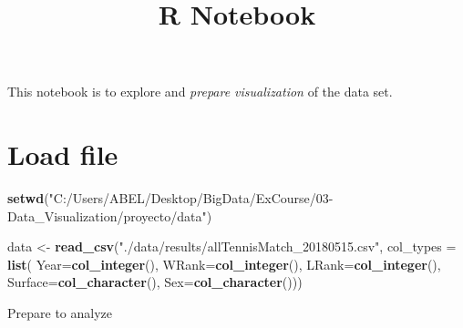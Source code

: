 \documentclass[]{article}
\title{R Notebook}
\author{}
\date{}
\newenvironment{Shaded}{\begin{snugshade}}{\end{snugshade}}
\newcommand{\CommentTok}[1]{\textcolor[rgb]{0.56,0.35,0.01}{\textit{#1}}}
\newcommand{\DataTypeTok}[1]{\textcolor[rgb]{0.13,0.29,0.53}{#1}}
\newcommand{\KeywordTok}[1]{\textcolor[rgb]{0.13,0.29,0.53}{\textbf{#1}}}
\newcommand{\NormalTok}[1]{#1}
\newcommand{\StringTok}[1]{\textcolor[rgb]{0.31,0.60,0.02}{#1}}
\begin{document}
\maketitle

This notebook is to explore and \emph{prepare visualization} of the data
set.

\hypertarget{load-file}{%
\section{Load file}\label{load-file}}

\begin{Shaded}
\begin{Highlighting}[]
\KeywordTok{setwd}\NormalTok{(}\StringTok{"C:/Users/ABEL/Desktop/BigData/ExCourse/03-Data_Visualization/proyecto/data"}\NormalTok{)}

\NormalTok{data <-}\StringTok{ }\KeywordTok{read_csv}\NormalTok{(}\StringTok{"./data/results/allTennisMatch_20180515.csv"}\NormalTok{, }
                 \DataTypeTok{col_types =} \KeywordTok{list}\NormalTok{(}
                        \DataTypeTok{Year=}\KeywordTok{col_integer}\NormalTok{(),}
                        \DataTypeTok{WRank=}\KeywordTok{col_integer}\NormalTok{(),}
                        \DataTypeTok{LRank=}\KeywordTok{col_integer}\NormalTok{(),}
                        \DataTypeTok{Surface=}\KeywordTok{col_character}\NormalTok{(),}
                        \DataTypeTok{Sex=}\KeywordTok{col_character}\NormalTok{()))}
\end{Highlighting}
\end{Shaded}

Prepare to analyze

\begin{Shaded}
\end{Shaded}

\begin{Shaded}
\end{Shaded}
\end{document}
